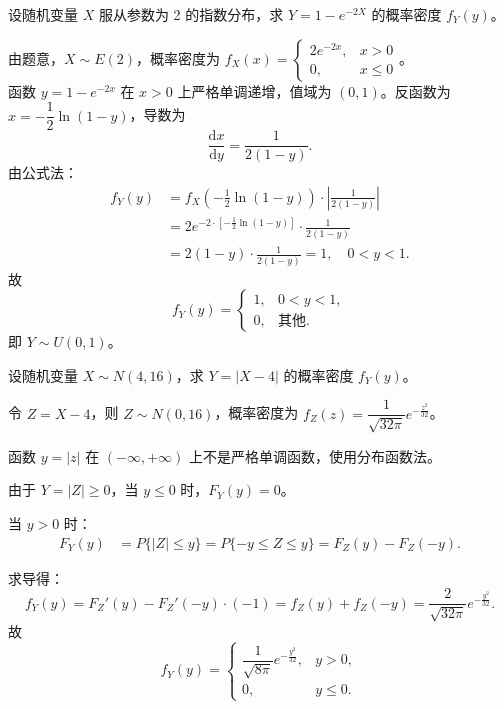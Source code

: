 \documentclass[lang=cn,11pt]{elegantbook}
\begin{document}
\begin{exercise}\label{exer:2-30}
设随机变量 $X$ 服从参数为 2 的指数分布，求 $Y=1-e^{-2X}$ 的概率密度 $f_Y(y)$。
\end{exercise}

\begin{solution}
由题意，$X \sim E(2)$，概率密度为 $f_X(x) = \begin{cases} 2e^{-2x}, & x>0 \\ 0, & x \le 0 \end{cases}$。\\
函数 $y = 1-e^{-2x}$ 在 $x>0$ 上严格单调递增，值域为 $(0,1)$。反函数为 $x = -\dfrac{1}{2}\ln(1-y)$，导数为
\[
\frac{\mathrm{d}x}{\mathrm{d}y} = \frac{1}{2(1-y)}.
\]
由公式法：
\begin{align*}
f_Y(y) &= f_X\!\left(-\frac{1}{2}\ln(1-y)\right) \cdot \left|\frac{1}{2(1-y)}\right| \\
&= 2e^{-2 \cdot \left[-\frac{1}{2}\ln(1-y)\right]} \cdot \frac{1}{2(1-y)} \\
&= 2(1-y) \cdot \frac{1}{2(1-y)} = 1, \quad 0 < y < 1.
\end{align*}
故
\[
f_Y(y) = \begin{cases}
1, & 0 < y < 1, \\[4pt]
0, & \text{其他}.
\end{cases}
\]
即 $Y \sim U(0,1)$。
\end{solution}

\begin{exercise}\label{exer:2-31}
设随机变量 $X \sim N(4,16)$，求 $Y=|X-4|$ 的概率密度 $f_Y(y)$。
\end{exercise}

\begin{solution}
令 $Z = X-4$，则 $Z \sim N(0,16)$，概率密度为 $f_Z(z) = \dfrac{1}{\sqrt{32\pi}} e^{-\frac{z^2}{32}}$。

函数 $y = |z|$ 在 $(-\infty,+\infty)$ 上不是严格单调函数，使用分布函数法。

由于 $Y = |Z| \ge 0$，当 $y \le 0$ 时，$F_Y(y) = 0$。

当 $y > 0$ 时：
\begin{align*}
F_Y(y) &= P\{|Z| \le y\} = P\{-y \le Z \le y\} = F_Z(y) - F_Z(-y).
\end{align*}

求导得：
\[
f_Y(y) = F_Z'(y) - F_Z'(-y) \cdot (-1) = f_Z(y) + f_Z(-y) = \frac{2}{\sqrt{32\pi}} e^{-\frac{y^2}{32}}.
\]
故
\[
f_Y(y) = \begin{cases}
\dfrac{1}{\sqrt{8\pi}} e^{-\frac{y^2}{32}}, & y > 0, \\[6pt]
0, & y \le 0.
\end{cases}
\]
\end{solution}
\end{document}
